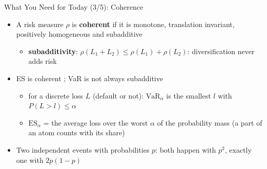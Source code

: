 \begin{frame}{What You Need for Today (3/5): Coherence}
\itemsize{\small}
\begin{itemize}
    \item A risk measure $\rho$ is \textbf{coherent}  if it is monotone, translation invariant, positively homogeneous and subadditive
    \begin{itemize}
        \item \textbf{subadditivity}: $\rho(L_1 + L_2) \le \rho(L_1) + \rho(L_2)$: diversification never adds risk
    \end{itemize}
    \item ES is coherent ; VaR is not always subadditive
    \begin{itemize}
        \item for a discrete loss $L$ (default or not): $\mathrm{VaR}_\alpha$ is the smallest $l$ with $P(L > l) \le \alpha$
        \item $\mathrm{ES}_\alpha$ = the average loss over the worst $\alpha$ of the probability mass (a part of an atom counts with its share)
    \end{itemize}
    \item Two independent events with probabilities $p$: both happen with $p^2$, exactly one with $2p(1 - p)$
\end{itemize}
\end{frame}


